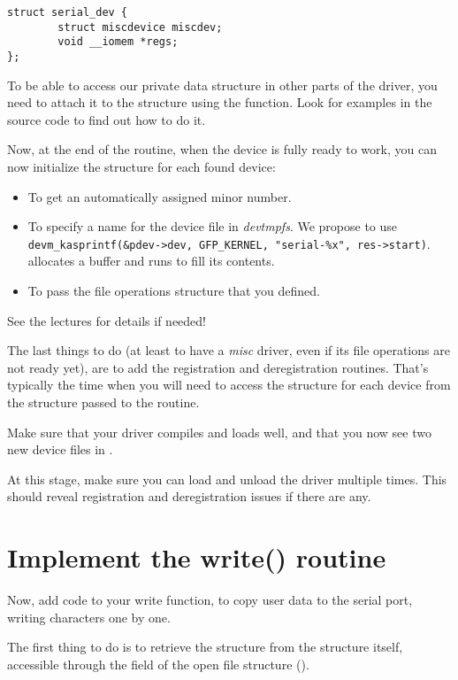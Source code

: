 \begin{verbatim}
struct serial_dev {
        struct miscdevice miscdev;
        void __iomem *regs;
};
\end{verbatim}

To be able to access our private data structure in other parts of the
driver, you need to attach it to the  structure using the
 function. Look for examples in the
source code to find out how to do it.

Now, at the end of the  routine, when the device is fully ready
to work, you can now initialize the  structure
for each found device:

\begin{itemize}
\item To get an automatically assigned minor number.
\item To specify a name for the device file in {\em devtmpfs}. We
  propose to use {\tt devm\_kasprintf(\&pdev->dev, GFP\_KERNEL,
  "serial-\%x", res->start)}.  allocates a
  buffer and runs  to fill its contents.
\item To pass the file operations structure that you defined.
\end{itemize}

See the lectures for details if needed!

The last things to do (at least to have a {\em misc} driver, even if
its file operations are not ready yet), are to add the registration and
deregistration routines. That's typically the time when you will need
to access the  structure for each device from the
 structure passed to the  routine.

Make sure that your driver compiles and loads well, and that you
now see two new device files in .

At this stage, make sure you can load and unload the driver multiple
times. This should reveal registration and deregistration issues if
there are any.

\section{Implement the write() routine}

Now, add code to your write function, to copy user data to the serial
port, writing characters one by one.

The first thing to do is to retrieve the  structure
from the  structure itself, accessible through the
 field of the open file structure ().

